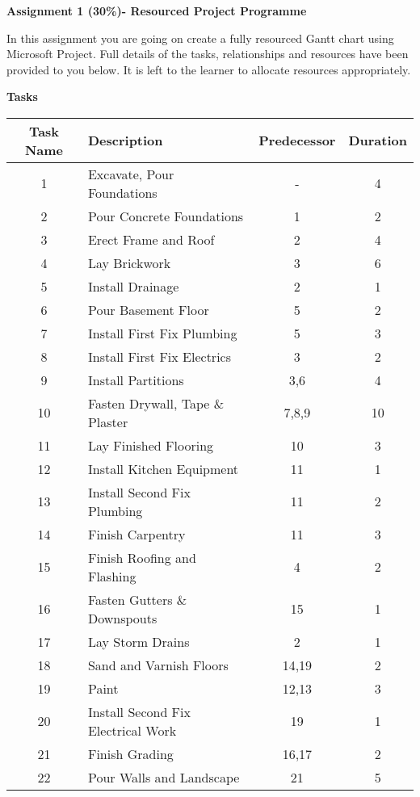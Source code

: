 

	
\begin{flushleft}
\Large\textbf{Assignment 1 (30\%)- Resourced Project Programme}\\
\end{flushleft}

In this assignment you are going on create a fully resourced Gantt chart using Microsoft Project.  Full details of the tasks, relationships and resources have been provided to you below.  It is left to the learner to allocate resources appropriately. 


\vspace{.5cm}
\large\textbf{Tasks}\\
\vspace{.25cm}

\begin{tabular}{|c|l|c|c|}
	\hline 
	\textbf{Task Name} & \textbf{Description} & \textbf{Predecessor} & \textbf{Duration} \\ 
	\hline 
	
	1	& Excavate, Pour Foundations &	-	&4\\\hline 
	2	& Pour Concrete Foundations		&1	&2\\\hline 
	3	& Erect Frame and Roof			&2	&4\\\hline 
	4	& Lay Brickwork					&3	&6\\\hline 
	5	& Install Drainage				&2	&1\\\hline 
	6	& Pour Basement Floor			&5	&2\\\hline 
	7	& Install First Fix Plumbing		&5	&3\\\hline 
	8	& Install First Fix Electrics	&3	&2\\\hline 
	9	& Install Partitions				&3,6	&4\\\hline
	10	& Fasten Drywall, Tape \& Plaster	&7,8,9	&10\\\hline 
	11	& Lay Finished Flooring			&10	&3\\\hline 
	12	& Install Kitchen Equipment		&11	&1\\\hline 
	13	& Install Second Fix Plumbing	&11	&2\\\hline 
	14	& Finish Carpentry				&11	&3\\\hline
	15	& Finish Roofing and Flashing	&4	&2\\\hline 
	16	& Fasten Gutters \& Downspouts	&15	&1\\\hline 
	17	& Lay Storm Drains				&2	&1\\\hline 
	18	& Sand and Varnish Floors		&14,19	&2\\\hline 
	19	& Paint							&12,13	&3\\\hline 
	20	& Install Second Fix Electrical Work	&19	&1\\\hline 
	21	& Finish Grading					&16,17	&2 \\\hline
	22	& Pour Walls and Landscape		&21	&5 \\
	\hline 
	 
\end{tabular} 


